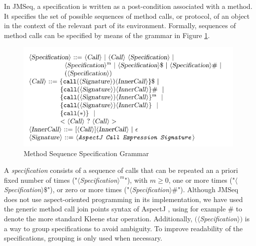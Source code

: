  
 

In JMSeq, a specification is written as a post-condition associated with a method. It
specifies the set of possible sequences of method calls, or protocol, of an
object in the context of the relevant part of its environment. Formally,
sequences of method calls can be specified by means
of the grammar in  Figure \ref{ch05:fig:spec_grammar}.

\begin{figure}[h]
\begin{center}
\begin{framed}
\includegraphics[scale=1]{grammar}
\end{framed}
\caption{Method Sequence Specification Grammar}
\label{ch05:fig:spec_grammar}
\end{center}
\end{figure}

A \textsl{specification} consists of a sequence of calls that can be repeated an
a priori fixed number of times 
("${\langle}$\textsl{Specification}${\rangle}^m$"), with $m \geq 0$, one or
more times ("${\langle}$\textsl{Specification}${\rangle}\$ $"), or zero or more
times ("${\langle}$\textsl{Specification}${\rangle}\#$"). Although JMSeq does
not use aspect-oriented programming in its implementation, we have used the
generic method call join points syntax of AspectJ \cite{kiczales_aspectj},
using for example $\#$ to denote the more standard Kleene star operation.
Additionally, $(\langle$\textsl{Specification}$\rangle)$ is a way to group
specifications to avoid ambiguity. To improve readability of the
specifications, grouping is only used when necessary.

